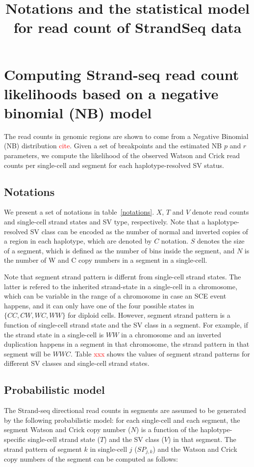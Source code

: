 \documentclass[12pt]{article}
\title{Notations and the statistical model for read count of StrandSeq data}
\renewcommand{\j}{j} %
\newcommand{\X}{X} %
\renewcommand{\k}{k} %
\newcommand{\T}{T} %
\newcommand{\V}{V} %
\begin{document}
\maketitle

\section{Computing Strand-seq read count likelihoods based on a negative binomial (NB) model}

The read counts in genomic regions are shown to come from a Negative Binomial (NB) distribution \textcolor{red}{cite}. %
Given a set of breakpoints and the estimated NB $p$ and $r$ parameters, we compute the likelihood of the observed Watson and Crick read counts per single-cell and segment for each haplotype-resolved SV status.

\subsection{Notations}
We present a set of notations in table~\ref{notations}. $\X$, $\T$ and $\V$ denote read counts and single-cell strand states and SV type, respectively.
Note that a haplotype-resolved SV class can be encoded as the number of normal and inverted copies of a region in each haplotype, which are denoted by $C$ notation.
$S$ denotes the size of a segment, which is defined as the number of bins inside the segment, and $N$ is the number of W and C copy numbers in a segment in a single-cell.

Note that segment strand pattern is differnt from single-cell strand states.
The latter is refered to the inherited strand-state in a single-cell in a chromosome, which can be variable in the range of a chromosome in case an SCE event happens, and it can only have one of the four possible states in $\{CC,CW,WC,WW\}$ for diploid cells.
However, segment strand pattern is a function of single-cell strand state and the SV class in a segment.
For example, if the strand state in a single-cell is $WW$ in a chromosome and an inverted duplication happens in a segment in that chromosome, the strand pattern in that segment will be $WWC$.
Table \textcolor{red}{xxx} shows the values of segment strand patterns for different SV classes and single-cell strand states.

\subsection{Probabilistic model}
The Strand-seq directional read counts in segments are assumed to be generated by the following probabilistic model:
for each single-cell and each segment, the segment Watson and Crick copy number ($N$) is a function of the haplotype-specific single-cell strand state ($T$) and the SV class ($V$) in that segment. The strand pattern of segment $\k$ in single-cell $\j$ ($SP_{\j,\k}$) and the Watson and Crick copy numbers of the segment can be computed as follows:
\end{document}
